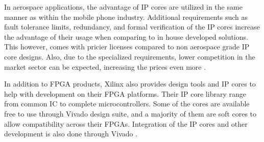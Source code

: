 \documentclass[12pt]{report}
\begin{document}
\par
In aerospace applications, the advantage of IP cores are utilized in the same manner as within the mobile phone industry. Additional requirements such as fault tolerance limits, redundancy, and formal verification of the IP cores increase the advantage of their usage when comparing to in house developed solutions. This however, comes with pricier licenses compared to non aerospace grade IP core designs. Also, due to the specialized requirements, lower competition in the market sector can be expected, increasing the prices even more \citep{DO254Cadence}.
\par
In addition to FPGA products, Xilinx also provides design tools and IP cores to help with development on their FPGA platforms. Their IP core library range from common IC to complete microcontrollers. Some of the cores are available free to use through Vivado design suite, and a majority of them are soft cores to allow compatibility across their FPGAs. Integration of the IP cores and other development is also done through Vivado \citep{XilVivado}.


\end{document}
